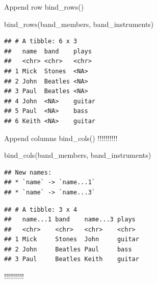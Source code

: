 \documentclass[
  ignorenonframetext,
]{beamer}
\newenvironment{Shaded}{\begin{snugshade}}{\end{snugshade}}
\newcommand{\FunctionTok}[1]{\textcolor[rgb]{0.00,0.00,0.00}{#1}}
\newcommand{\NormalTok}[1]{#1}
\begin{document}
\begin{frame}[fragile]{Append row bind\_rows()}
\protect\hypertarget{append-row-bind_rows}{}
\footnotesize

\begin{Shaded}
\begin{Highlighting}[]
\FunctionTok{bind\_rows}\NormalTok{(band\_members, band\_instruments)}
\end{Highlighting}
\end{Shaded}

\begin{verbatim}
## # A tibble: 6 x 3
##   name  band    plays 
##   <chr> <chr>   <chr> 
## 1 Mick  Stones  <NA>  
## 2 John  Beatles <NA>  
## 3 Paul  Beatles <NA>  
## 4 John  <NA>    guitar
## 5 Paul  <NA>    bass  
## 6 Keith <NA>    guitar
\end{verbatim}

\normalsize
\end{frame}

\begin{frame}[fragile]{Append columns bind\_cols()}
\protect\hypertarget{append-columns-bind_cols}{}
!!!!!!!!!!

\footnotesize

\begin{Shaded}
\begin{Highlighting}[]
\FunctionTok{bind\_cols}\NormalTok{(band\_members, band\_instruments)}
\end{Highlighting}
\end{Shaded}

\begin{verbatim}
## New names:
## * `name` -> `name...1`
## * `name` -> `name...3`
\end{verbatim}

\begin{verbatim}
## # A tibble: 3 x 4
##   name...1 band    name...3 plays 
##   <chr>    <chr>   <chr>    <chr> 
## 1 Mick     Stones  John     guitar
## 2 John     Beatles Paul     bass  
## 3 Paul     Beatles Keith    guitar
\end{verbatim}

\normalsize

!!!!!!!!!!
\end{frame}
\end{document}
